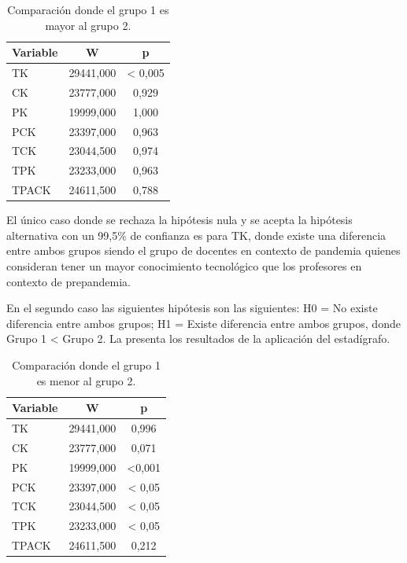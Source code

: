 \documentclass[spanish]{textolivre}
\begin{document}
\begin{table}[h!]
\centering
\begin{threeparttable}
\caption{Comparación donde el grupo 1 es mayor al grupo 2.}
\label{tab06}
\centering
\begin{tabular}{l*{2}{S}}
\toprule
Variable & {W} & {p} \\
\midrule
TK & 29441,000 & < 0,005 \\	
CK & 23777,000 & 0,929 \\
PK & 19999,000 & 1,000 \\
PCK & 23397,000 & 0,963 \\
TCK & 23044,500 & 0,974 \\
TPK & 23233,000 & 0,963 \\
TPACK & 24611,500 & 0,788 \\
\bottomrule
\end{tabular}
\end{threeparttable}
\end{table}

El único caso donde se rechaza la hipótesis nula y se acepta la hipótesis alternativa con un 99,5\% de confianza es para TK, donde existe una diferencia entre ambos grupos siendo el grupo de docentes en contexto de pandemia quienes consideran tener un mayor conocimiento tecnológico que los profesores en contexto de prepandemia.

En el segundo caso las siguientes hipótesis son las siguientes: H0 = No existe diferencia entre ambos grupos; H1 = Existe diferencia entre ambos grupos, donde Grupo 1 < Grupo 2. La  presenta los resultados de la aplicación del estadígrafo.

\begin{table}[h!]
\centering
\begin{threeparttable}
\caption{Comparación donde el grupo 1 es menor al grupo 2.}
\label{tab07}
\centering
\begin{tabular}{l*{2}{S}}
\toprule
Variable & {W} & {p} \\
\midrule
TK & 29441,000 & 0,996 \\
CK & 23777,000 & 0,071 \\
PK & 19999,000 & <0,001 \\
PCK & 23397,000 & < 0,05 \\
TCK & 23044,500 & < 0,05 \\
TPK & 23233,000 & < 0,05 \\
TPACK & 24611,500 & 0,212 \\
\bottomrule
\end{tabular}
\end{threeparttable}
\end{table}
\end{document}
